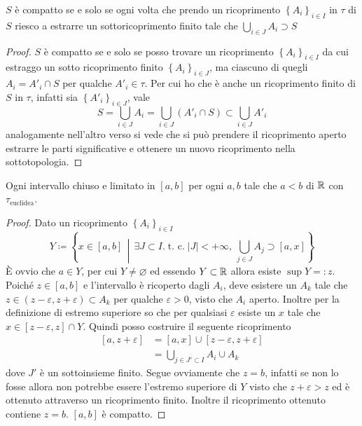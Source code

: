 \begin{remark}
	$S$ è compatto se e solo se ogni volta che prendo un ricoprimento $\left\{A_i\right\}_{i \in I}$ in $\tau$ di $S$ riesco a estrarre un sottoricoprimento finito tale che $\bigcup_{i \in J} A_i \supset S$ 
	\begin{proof}
		$S$ è compatto se e solo se posso trovare un ricoprimento $\left\{A_i\right\}_{i \in I}$ da cui estraggo un sotto ricoprimento finito $\left\{A_i\right\}_{i \in J}$, ma ciascuno di quegli $A_i = A'_i \cap S$ per qualche $A'_i \in \tau$. Per cui ho che è anche un ricoprimento finito di $S$ in $\tau$, infatti sia $\left\{A'_i\right\}_{i\in J}$, vale 
		\begin{equation*}
			S = \bigcup_{i \in J} A_i = \bigcup_{i \in J} (A'_i \cap S)  \subset  \bigcup_{i \in J} A'_i
		\end{equation*}
		analogamente nell'altro verso si vede che si può prendere il ricoprimento aperto estrarre le parti significative e ottenere un nuovo ricoprimento nella sottotopologia.
	\end{proof}
\end{remark}


\begin{theorem}
	Ogni intervallo chiuso e limitato in $\left[a, b\right]$ per ogni $a, b$ tale che $a < b$ di $\mathbb{R}$ con $\tau_{\text{euclidea}}$.
\end{theorem} 
\begin{proof}
	Dato un ricoprimento $\left\{A_i\right\}_{i \in I}$ 
	\begin{equation*}
			Y \coloneqq \left\{ x\in \left[a,b\right] \,\middle|\, \exists J \subset I. \; \text{t. c.} \; |J| < +\infty,\ \bigcup_{j \in J} A_j \supset \left[a,x\right] \right\}
	\end{equation*}
	È ovvio che $a \in Y$, per cui $Y \neq \varnothing$ ed essendo $Y \subset \mathbb{R}$ allora esiste $\sup Y =: z$. Poiché $z \in \left[a,b\right]$ e l'intervallo è ricoperto dagli $A_i$, deve esistere un $A_{k}$ tale che $z \in (z-\varepsilon, z+\varepsilon) \subset A_k$ per qualche $\varepsilon > 0$, visto che $A_i$ aperto. Inoltre per la definizione di estremo superiore so che per qualsiasi $\varepsilon$ esiste un $x$ tale che $x \in \left[z-\varepsilon, z\right] \cap Y$. Quindi posso costruire il seguente ricoprimento
	\begin{align*}
		\left[a,z+\varepsilon\right] & = \left[a,x\right] \cup \left[z-\varepsilon, z+\varepsilon\right]\\
				& =  \bigcup_{j \in J' \subset I} A_i \cup A_k
	\end{align*}
	dove $J'$ è un sottoinsieme finito. Segue ovviamente che $z = b$, infatti se non lo fosse allora non potrebbe essere l'estremo superiore di $Y$ visto che $z+\varepsilon > z$ ed è ottenuto attraverso un ricoprimento finito. Inoltre il ricoprimento ottenuto contiene $z = b$. $\left[a,b\right]$ è compatto.
\end{proof}

